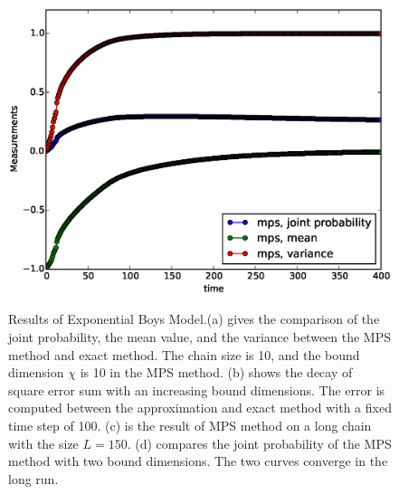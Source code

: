 \documentclass[english]{article}
\begin{document}
\begin{figure}[htbp]
{\includegraphics[scale=0.4]{Result_Fig/Projection_MPS_t400_s200_bd10.eps}}\hfill
{}
  \caption{Results of Exponential Boys Model.(a) gives the comparison of the joint probability, the mean value, and the variance between the MPS method and exact method. The chain size is 10, and the bound dimension $\chi$ is 10 in the MPS method. (b) shows the decay of square error sum with an increasing bound dimensions. The error is computed between the approximation and exact method with a fixed time step of 100. (c) is the result of MPS method on a long chain with the size $L=150$. (d) compares the joint probability of the MPS method with two bound dimensions. The two curves converge in the long run.}
  \label{fig:Projection_result}
\end{figure}
\end{document}
